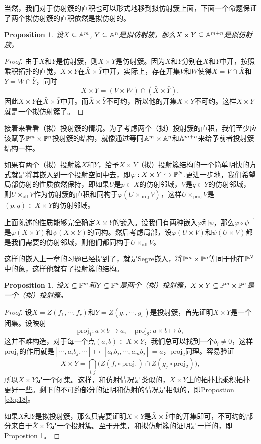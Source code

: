 \documentclass[9pt]{extarticle}
\theoremstyle{plain}%
\newtheorem{pro}[defi]{Proposition}%
\begin{document}
当然，我们对于仿射簇的直积也可以形式地移到拟仿射簇上面，下面一个命题保证了两个拟仿射簇的直积依然是拟仿射的。
\begin{pro}
	设$X\subseteq \mathbb{A}^{m}$, $Y\subseteq \mathbb{A}^{n}$是拟仿射簇，那么$X\times Y\subseteq \mathbb{A}^{m+n}$是拟仿射簇。
	\label{c3:p23}
\end{pro}
\begin{proof}
	由于$\bar{X}$和$\bar{Y}$是仿射簇，则$\bar{X}\times \bar{Y}$是仿射簇。因为$X$和$Y$分别在$\bar{X}$和$\bar{Y}$中开，按照乘积拓扑的直觉，$X\times Y$在$\bar{X}\times \bar{Y}$中开，实际上，存在开集$V$和$W$使得$X=V\cap \bar{X}$和$Y=W\cap \bar{Y}$，同时
	\[
		X\times Y=(V\times W)\cap(\bar{X}\times \bar{Y}),
	\]
	因此$X\times Y$在$\bar{X}\times \bar{Y}$中开。而$\bar{X}\times \bar{Y}$不可约，所以他的开集$X\times Y$不可约。这样$X\times Y$就是一个拟仿射簇了。
\end{proof}

接着来看看（拟）投射簇的情况。为了考虑两个（拟）投射簇的直积，我们至少应该赋予$\mathbb{P}^m\times \mathbb{P}^n$投射簇的结构，就像通过等同$\mathbb{A}^{m}\times \mathbb{A}^n$和$\mathbb{A}^{m+n}$来给予前者投射簇结构一样。

如果有两个（拟）投射簇$X$和$Y$，给予$X\times Y$（拟）投射簇结构的一个简单明快的方式就是将其嵌入到一个投射空间中去，即$\varphi:X\times Y\hookrightarrow \mathbb{P}^N$.更进一步地，我们希望局部仿射的性质依然保持，即如果$U$是$p\in X$的仿射邻域，$V$是$q\in Y$的仿射邻域，则$U\times_{\mathrm{aff}} V$作为仿射簇的直积和同构于$\varphi(U\times_{\mathrm{proj}} V)$，这样$U\times_{\mathrm{proj}} V$是$(p,q)\in X\times Y$的仿射邻域。

上面陈述的性质能够完全确定$X\times Y$的嵌入。设我们有两种嵌入$\varphi$和$\psi$，那么$\varphi\circ \psi^{-1}$是$\varphi(X\times Y)$和$\psi(X\times Y)$的同构。然后考虑局部，设$\varphi(U\times V)$和$\psi(U\times V)$都是我们需要的仿射邻域，则他们都同构于$U\times_{\mathrm{aff}} V$。

这样的嵌入上一章的习题已经提到了，就是Segre嵌入，将$\mathbb{P}^m\times \mathbb{P}^n$等同于他在$\mathbb{P}^N$中的象，这样他就有了投射簇的结构。
\begin{pro}
	设$X\subseteq \mathbb{P}^m$和$Y\subseteq \mathbb{P}^n$是两个（拟）投射簇，$X\times Y\subseteq \mathbb{P}^m\times \mathbb{P}^n$是一个（拟）投射簇。
\end{pro}
\begin{proof}
	设$X=Z(f_1,\cdots,f_r)$和$Y=Z(g_1,\cdots,g_s)$是投射簇，首先证明$X\times Y$是一个闭集。设映射
	\[
		\mathrm{proj}_1:a\times b\mapsto a,\quad \mathrm{proj}_2:a\times b\mapsto b,
	\]
	这并不难构造，对于每一个点$(a,b)\in X\times Y$，我们总可以找到一个$b_i\neq 0$，这样$\mathrm{proj}_1$的作用就是$[\cdots,a_ib_j,\cdots]\mapsto [a_0b_j,\cdots,a_mb_j]=a$，$\mathrm{proj}_2$同理。容易验证
	\[
		X\times Y=\bigcap_{i,j}\bigl(Z(f_i\circ \mathrm{proj}_1)\cap Z(g_j\circ \mathrm{proj}_2)\bigr),
	\]
	所以$X\times Y$是一个闭集。这样，和仿射情况是类似的，$X\times Y$上的拓扑比乘积拓扑更好一些。剩下的不可约部分的证明和仿射的情况是相似的，即Propostion \ref{c3:p18}。

	如果$X$和$Y$是拟投射簇，那么只需要证明$X\times Y$是$\bar{X}\times \bar{Y}$中的开集即可，不可约的部分来自于$\bar{X}\times \bar{Y}$是一个投射簇。至于开集，和拟仿射簇的证明是一样的，即Propostion \ref{c3:p23}。
\end{proof}
\end{document}
